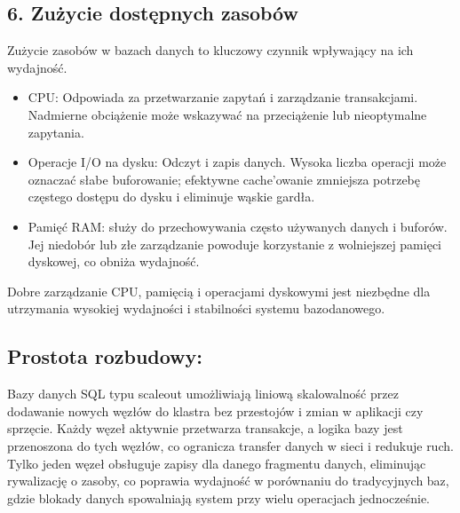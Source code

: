 \documentclass[a4paper,11pt,openany,english]{sphinxmanual}
\begin{document}
\subsection{6. Zużycie dostępnych zasobów}
\label{\detokenize{rozdzial2/index:zuzycie-dostepnych-zasobow}}
\sphinxAtStartPar
Zużycie zasobów w bazach danych to kluczowy czynnik wpływający na ich wydajność.
\begin{description}
\begin{itemize}
\item {} 
\sphinxAtStartPar
CPU: Odpowiada za przetwarzanie zapytań i zarządzanie transakcjami. Nadmierne obciążenie może wskazywać na przeciążenie lub nieoptymalne zapytania.

\item {} 
\sphinxAtStartPar
Operacje I/O na dysku: Odczyt i zapis danych. Wysoka liczba operacji może oznaczać słabe buforowanie; efektywne cache’owanie zmniejsza potrzebę częstego dostępu do dysku i eliminuje wąskie gardła.

\item {} 
\sphinxAtStartPar
Pamięć RAM: służy do przechowywania często używanych danych i buforów. Jej niedobór lub złe zarządzanie powoduje korzystanie z wolniejszej pamięci dyskowej, co obniża wydajność.

\end{itemize}

\end{description}

\sphinxAtStartPar
Dobre zarządzanie CPU, pamięcią i operacjami dyskowymi jest niezbędne dla utrzymania wysokiej wydajności i stabilności systemu bazodanowego.


\subsection{Prostota rozbudowy:}
\label{\detokenize{rozdzial2/index:prostota-rozbudowy}}
\sphinxAtStartPar
Bazy danych SQL typu scale\sphinxhyphen{}out umożliwiają liniową skalowalność przez dodawanie nowych węzłów do klastra bez przestojów i zmian w aplikacji czy sprzęcie. Każdy węzeł aktywnie przetwarza transakcje, a logika bazy jest przenoszona do tych węzłów, co ogranicza transfer danych w sieci i redukuje ruch. Tylko jeden węzeł obsługuje zapisy dla danego fragmentu danych, eliminując rywalizację o zasoby, co poprawia wydajność w porównaniu do tradycyjnych baz, gdzie blokady danych spowalniają system przy wielu operacjach jednocześnie.
\end{document}
